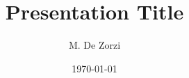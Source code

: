\documentclass{beamer}
\author{M. De Zorzi}
\date{\today}
\title{Presentation Title}
\begin{document}
\frame{
	\titlepage%
}
\end{document}
